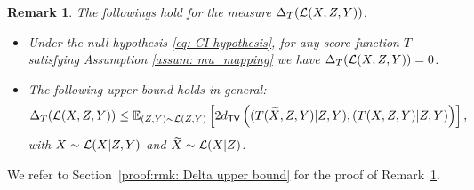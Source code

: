 \documentclass[11pt]{article}
\newtheorem{rmk}[propo]{Remark}
\newcommand{\indep}{\perp \!\!\! \perp}
\def\tv{\mathsf{TV}}
\begin{document}
	\begin{rmk}\label{rmk: Delta upper bound} The followings hold for the measure $\Delta_T(\mathcal{L}(X,Z,Y))$.
	\begin{itemize}
	\item[(a)] Under the null hypothesis \eqref{eq: CI hypothesis}, for any score function $T$ satisfying Assumption \ref{assum: mu_mapping} we have $\Delta_{T}(\mathcal{L}(X,Z,Y))= 0$.
	\item[(b)] The following upper bound holds in general:
	\[
		\Delta_T(\cL(X,Z,Y))\leq \E_{(Z,Y) \sim \cL(Z,Y)}\left[2 d_{\tv}\left(  (T(\tX,Z,Y)|Z,Y), (T(X,Z,Y)|Z,Y) \right)\right],		\]
		with $X\sim \mathcal{L}(X|Z,Y)$ and ${\widetilde{X}}\sim \mathcal{L}(X|Z)$.
	\end{itemize}
	\end{rmk}
We refer to Section~\ref{proof:rmk: Delta upper bound} for the proof of Remark~\ref{rmk: Delta upper bound}.







\noindent
 
\end{document}
